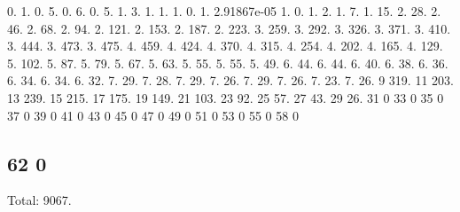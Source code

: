 0. 1. 0. 5. 0. 6. 0. 5. 1. 3. 1. 1. 1. 0. 1. 2.\+91867e-\/05 1. 0. 1. 2. 1. 7. 1. 15. 2. 28. 2. 46. 2. 68. 2. 94. 2. 121. 2. 153. 2. 187. 2. 223. 3. 259. 3. 292. 3. 326. 3. 371. 3. 410. 3. 444. 3. 473. 3. 475. 4. 459. 4. 424. 4. 370. 4. 315. 4. 254. 4. 202. 4. 165. 4. 129. 5. 102. 5. 87. 5. 79. 5. 67. 5. 63. 5. 55. 5. 55. 5. 49. 6. 44. 6. 44. 6. 40. 6. 38. 6. 36. 6. 34. 6. 34. 6. 32. 7. 29. 7. 28. 7. 29. 7. 26. 7. 29. 7. 26. 7. 23. 7. 26. 9 319. 11 203. 13 239. 15 215. 17 175. 19 149. 21 103. 23 92. 25 57. 27 43. 29 26. 31 0 33 0 35 0 37 0 39 0 41 0 43 0 45 0 47 0 49 0 51 0 53 0 55 0 58 0 \subsection*{62 0 }

Total\+: 9067. 